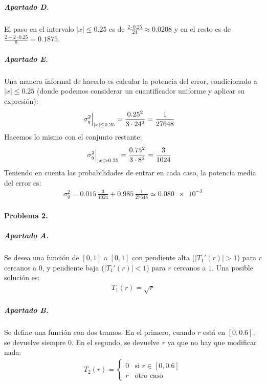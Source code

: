 \subparagraph{Apartado D.}

El paso en el intervalo $\left|x\right| \leq \num{0.25}$ es de
$\frac{2 \cdot \num{0.25}}{24} \approx \num{0.0208}$ y en el resto es de
$\frac{2 - 2 \cdot \num{0.25}}{8} = \num{0.1875}$.

\subparagraph{Apartado E.}

Una manera informal de hacerlo es calcular la potencia del error,
condicionado a $\left|x\right| \leq \num{0.25}$ (donde podemos considerar un
cuantificador uniforme y aplicar su expresión):
%
\begin{align*}
  \Bigl. \sigma_q^2 \Bigr|_{\left|x\right| \leq \num{0.25}}
    &= \frac{\num{.25}^2}{3 \cdot 24^2} = \frac{1}{27648}
\end{align*}
%
Hacemos lo mismo con el conjunto restante:
%
\begin{align*}
  \Bigl. \sigma_q^2 \Bigr|_{\left|x\right| > \num{0.25}}
    &= \frac{\num{.75}^2}{3 \cdot 8^2} = \frac{3}{1024}
\end{align*}
%
Teniendo en cuenta las probabilidades de entrar en cada caso,
la potencia media del error es:
%
\begin{align*}
  \sigma_q^2 = \num{0.015} \, \frac{3}{1024} + \num{0.985} \, \frac{1}{27648}
             \simeq \num{0.080e-3}
\end{align*}

\finishpage
\startpage

\paragraph{Problema 2.}

\subparagraph{Apartado A.}

Se desea una función de $\left[0, 1\right]$ a $\left[0, 1\right]$ con
pendiente alta ($\left|T_1'(r)\right| > 1$) para $r$ cercanos a $0$, y pendiente
baja ($\left|T_1'(r)\right| < 1$) para $r$ cercanos a $1$. Una posible solución
es:
%
\begin{align*}
  T_1(r) = \sqrt{r}
\end{align*}

\subparagraph{Apartado B.}

Se define una función con dos tramos. En el primero, cuando $r$ está en $\left[
\num{0}, \num{0.6}\right]$, se devuelve siempre $0$. En el segundo, se devuelve
$r$ ya que no hay que modificar nada:
%
\begin{align*}
  T_2(r) = \begin{cases}
    0 & \text{si $r \in \left[\num{0}, \num{0.6}\right]$} \\
    r & \text{otro caso}
  \end{cases}
\end{align*}

